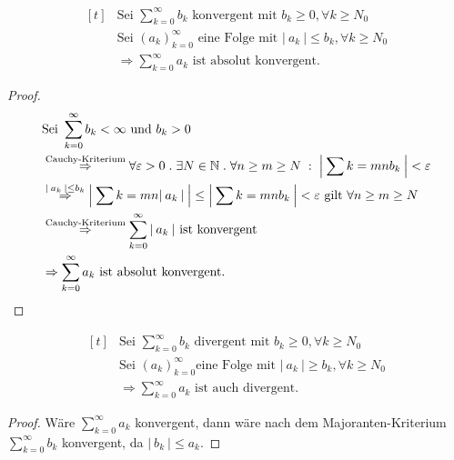 \documentclass[a4paper,titlepage,oneside]{article}
\def\N{\ensuremath{\mathbb{N}} }
\renewcommand{\epsilon}{\ensuremath{\varepsilon} }
\def\WSP{\text{Widerspruch! }}
\def\sp{\hspace{0,1cm}}
\def\spdot{\sp.\sp}
\def\spcolon{\sp:\sp}
\newcommand{\suminf}[2][n]{\ensuremath{\sum_{#1= 0}^{\infty}{#2}}}
\newcommand{\abs}[1]{\ensuremath{\left|\:#1\:\right|}}
\theoremstyle{thmstyle}
\begin{document}
\begin{subsatz}
\[\begin{aligned}[t]
&\text{Sei } \suminf[k]{b_k} \text{ konvergent mit } b_k \ge 0 , \forall k \ge N_0 \\
&\text{Sei } (a_k)_{k=0}^{\infty} \text{ eine Folge mit } \abs{a_k} \le b_k , \forall k \ge N_0 \\
&\Rightarrow \suminf[k]{a_k} \text{ ist absolut konvergent.}
\end{aligned}\]

\begin{proof}
\[\begin{aligned}[t]
&\text{Sei } \suminf[k]{b_k} < \infty \text{ und } b_k > 0 \\
&\overset{\text{Cauchy-Kriterium}}{\Rightarrow} \forall \epsilon > 0 \spdot \exists N \in \N \spdot \forall n \ge m \ge N \spcolon \abs{\sum{k=m}{n}{b_k}} < \epsilon \\
&\overset{\abs{a_k} \le b_k}{\Rightarrow} \abs{\sum{k=m}{n}{\abs{a_k}}} \le \abs{\sum{k=m}{n}{b_k}} < \epsilon \text{ gilt } \forall n \ge m \ge N \\
&\overset{\text{Cauchy-Kriterium}}{\Rightarrow} \suminf[k]{\abs{a_k}} \text{ ist konvergent} \\
&\Rightarrow \suminf[k]{a_k}\text{ ist absolut konvergent.}
\end{aligned}\]
\end{proof}
\end{subsatz}

\begin{subkorr}
\[\begin{aligned}[t]
&\text{Sei } \suminf[k]{b_k} \text{ divergent mit } b_k \ge 0 , \forall k \ge N_0 \\
&\text{Sei } (a_k)_{k=0}^{\infty} \text{eine Folge mit } \abs{a_k} \ge b_k , \forall k \ge N_0 \\
&\Rightarrow \suminf[k]{a_k} \text{ ist auch divergent.}
\end{aligned}\]

\begin{proof}
Wäre \(\suminf[k]{a_k}\) konvergent, dann wäre nach dem Majoranten-Kriterium \(\suminf[k]{b_k}\) konvergent, da \(\abs{b_k} \le a_k\). \WSP
\end{proof}
\end{subkorr}
\end{document}
